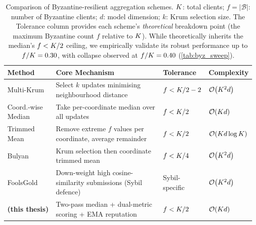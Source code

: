 \documentclass[../main]{subfiles}
\begin{document}
\begin{table}[htbp]
\centering
\caption[Comparison of Byzantine-resilient aggregation schemes]{Comparison of Byzantine-resilient aggregation schemes. $K$: total clients; $f = |\mathcal{B}|$: number of Byzantine clients; $d$: model dimension; $k$: Krum selection size. The Tolerance column provides each scheme's \emph{theoretical} breakdown point (the maximum Byzantine count $f$ relative to $K$). While \aegis{} theoretically inherits the median's $f < K/2$ ceiling, we empirically validate its robust performance up to $f/K = 0.30$, with collapse observed at $f/K = 0.40$ (\cref{tab:byz_sweep}).}
\label{tab:agg_comparison}
\begin{tabularx}{\linewidth}{lXll}
\toprule
\textbf{Method} & \textbf{Core Mechanism} & \textbf{Tolerance} & \textbf{Complexity} \\
\midrule
Multi-Krum \citep{blanchard2017machine}
    & Select $k$ updates minimising neighbourhood distance
    & $f < K/2 - 2$
    & $\mathcal{O}\!\left(K^2 d\right)$ \\
\addlinespace
Coord.-wise Median \citep{yin2018byzantine}
    & Take per-coordinate median over all updates
    & $f < K/2$
    & $\mathcal{O}\!\left(K d\right)$ \\
\addlinespace
Trimmed Mean \citep{yin2018byzantine}
    & Remove extreme $f$ values per coordinate, average remainder
    & $f < K/2$
    & $\mathcal{O}\!\left(K d\log K\right)$ \\
\addlinespace
Bulyan \citep{mhamdi2018hidden}
    & Krum selection then coordinate trimmed mean
    & $f < K/4$
    & $\mathcal{O}\!\left(K^2 d\right)$ \\
\addlinespace
FoolsGold \citep{fung2020limitations}
    & Down-weight high cosine-similarity submissions (Sybil defence)
    & Sybil-specific
    & $\mathcal{O}\!\left(K^2 d\right)$ \\
\addlinespace
\textbf{\aegis{} (this thesis)}
    & Two-pass median + dual-metric scoring + EMA reputation
    & $f < K/2$
    & $\mathcal{O}\!\left(K d\right)$ \\
\bottomrule
\end{tabularx}
\end{table}
\end{document}
